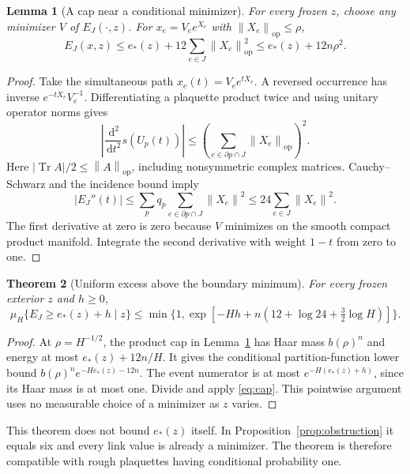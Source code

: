 \documentclass[11pt]{article}
\newtheorem{theorem}{Theorem}[section]
\newtheorem{lemma}[theorem]{Lemma}
\theoremstyle{definition}
\theoremstyle{remark}
\newcommand{\Tr}{\operatorname{Tr}}
\newcommand{\norm}[1]{\left\lVert#1\right\rVert}
\newcommand{\dd}{\,\mathrm d}
\begin{document}
\begin{lemma}[A cap near a conditional minimizer]\label{lem:minimizer}
For every frozen $z$, choose any minimizer $V$ of $E_J(\cdot,z)$.
For $x_e=V_e e^{X_e}$ with $\norm{X_e}_{\mathrm{op}}\le\rho$,
\[
 E_J(x,z)\le e_*(z)+12\sum_{e\in J}\norm{X_e}_{\mathrm{op}}^2
 \le e_*(z)+12n\rho^2.
\]
\end{lemma}
\begin{proof}
Take the simultaneous path $x_e(t)=V_e e^{tX_e}$. A reversed occurrence
has inverse $e^{-tX_e}V_e^{-1}$. Differentiating a plaquette product twice
and using unitary operator norms gives
\[
 \left|\frac{\dd^2}{\dd t^2}s(U_p(t))\right|
 \le\left(\sum_{e\in\partial p\cap J}\norm{X_e}_{\mathrm{op}}\right)^2.
\]
Here $|\Tr A|/2\le\norm A_{\mathrm{op}}$, including nonsymmetric
complex matrices. Cauchy--Schwarz and the incidence bound imply
\[
 |E_J''(t)|\le\sum_p q_p\sum_{e\in\partial p\cap J}\norm{X_e}^2
 \le24\sum_{e\in J}\norm{X_e}^2.
\]
The first derivative at zero is zero because $V$ minimizes on the smooth
compact product manifold. Integrate the second derivative with weight
$1-t$ from zero to one.
\end{proof}

\begin{theorem}[Uniform excess above the boundary minimum]\label{thm:excess}
For every frozen exterior $z$ and $h\ge0$,
\begin{equation}
 \mu_H\{E_J\ge e_*(z)+h\mid z\}
 \le \min\{1,\exp[-Hh+n(12+\log24+\tfrac32\log H)]\}.
 \label{eq:excess}
\end{equation}
\end{theorem}
\begin{proof}
At $\rho=H^{-1/2}$, the product cap in Lemma~\ref{lem:minimizer} has
Haar mass $b(\rho)^n$ and energy at most $e_*(z)+12n/H$. It gives the
conditional partition-function lower bound
$b(\rho)^n e^{-He_*(z)-12n}$. The event numerator is at most
$e^{-H(e_*(z)+h)}$, since its Haar mass is at most one.
Divide and apply \eqref{eq:cap}. This pointwise argument uses no
measurable choice of a minimizer as $z$ varies.
\end{proof}
This theorem does not bound $e_*(z)$ itself. In
Proposition~\ref{prop:obstruction} it equals six and every link value is
already a minimizer. The theorem is therefore compatible with rough
plaquettes having conditional probability one.
\end{document}
